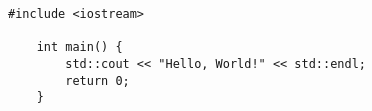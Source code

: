 \documentclass[12pt,numbers=enddot]{scrartcl}
\begin{document}
\printtitlepage

\tableofcontents



\begin{lstlisting}[style=ISI_code]
    #include <iostream>
    
    int main() {
        std::cout << "Hello, World!" << std::endl;
        return 0;
    }
\end{lstlisting}

\printbibliography
\end{document}

